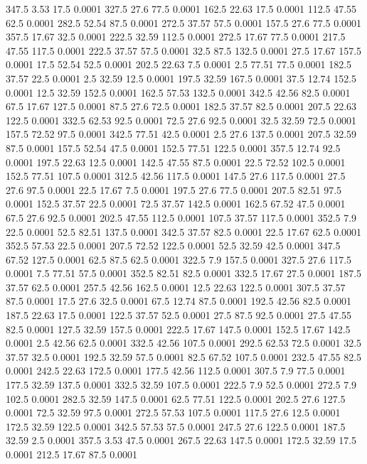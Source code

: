 347.5	3.53	17.5	0.0001
327.5	27.6	77.5	0.0001
162.5	22.63	17.5	0.0001
112.5	47.55	62.5	0.0001
282.5	52.54	87.5	0.0001
272.5	37.57	57.5	0.0001
157.5	27.6	77.5	0.0001
357.5	17.67	32.5	0.0001
222.5	32.59	112.5	0.0001
272.5	17.67	77.5	0.0001
217.5	47.55	117.5	0.0001
222.5	37.57	57.5	0.0001
32.5	87.5	132.5	0.0001
27.5	17.67	157.5	0.0001
17.5	52.54	52.5	0.0001
202.5	22.63	7.5	0.0001
2.5	77.51	77.5	0.0001
182.5	37.57	22.5	0.0001
2.5	32.59	12.5	0.0001
197.5	32.59	167.5	0.0001
37.5	12.74	152.5	0.0001
12.5	32.59	152.5	0.0001
162.5	57.53	132.5	0.0001
342.5	42.56	82.5	0.0001
67.5	17.67	127.5	0.0001
87.5	27.6	72.5	0.0001
182.5	37.57	82.5	0.0001
207.5	22.63	122.5	0.0001
332.5	62.53	92.5	0.0001
72.5	27.6	92.5	0.0001
32.5	32.59	72.5	0.0001
157.5	72.52	97.5	0.0001
342.5	77.51	42.5	0.0001
2.5	27.6	137.5	0.0001
207.5	32.59	87.5	0.0001
157.5	52.54	47.5	0.0001
152.5	77.51	122.5	0.0001
357.5	12.74	92.5	0.0001
197.5	22.63	12.5	0.0001
142.5	47.55	87.5	0.0001
22.5	72.52	102.5	0.0001
152.5	77.51	107.5	0.0001
312.5	42.56	117.5	0.0001
147.5	27.6	117.5	0.0001
27.5	27.6	97.5	0.0001
22.5	17.67	7.5	0.0001
197.5	27.6	77.5	0.0001
207.5	82.51	97.5	0.0001
152.5	37.57	22.5	0.0001
72.5	37.57	142.5	0.0001
162.5	67.52	47.5	0.0001
67.5	27.6	92.5	0.0001
202.5	47.55	112.5	0.0001
107.5	37.57	117.5	0.0001
352.5	7.9	22.5	0.0001
52.5	82.51	137.5	0.0001
342.5	37.57	82.5	0.0001
22.5	17.67	62.5	0.0001
352.5	57.53	22.5	0.0001
207.5	72.52	122.5	0.0001
52.5	32.59	42.5	0.0001
347.5	67.52	127.5	0.0001
62.5	87.5	62.5	0.0001
322.5	7.9	157.5	0.0001
327.5	27.6	117.5	0.0001
7.5	77.51	57.5	0.0001
352.5	82.51	82.5	0.0001
332.5	17.67	27.5	0.0001
187.5	37.57	62.5	0.0001
257.5	42.56	162.5	0.0001
12.5	22.63	122.5	0.0001
307.5	37.57	87.5	0.0001
17.5	27.6	32.5	0.0001
67.5	12.74	87.5	0.0001
192.5	42.56	82.5	0.0001
187.5	22.63	17.5	0.0001
122.5	37.57	52.5	0.0001
27.5	87.5	92.5	0.0001
27.5	47.55	82.5	0.0001
127.5	32.59	157.5	0.0001
222.5	17.67	147.5	0.0001
152.5	17.67	142.5	0.0001
2.5	42.56	62.5	0.0001
332.5	42.56	107.5	0.0001
292.5	62.53	72.5	0.0001
32.5	37.57	32.5	0.0001
192.5	32.59	57.5	0.0001
82.5	67.52	107.5	0.0001
232.5	47.55	82.5	0.0001
242.5	22.63	172.5	0.0001
177.5	42.56	112.5	0.0001
307.5	7.9	77.5	0.0001
177.5	32.59	137.5	0.0001
332.5	32.59	107.5	0.0001
222.5	7.9	52.5	0.0001
272.5	7.9	102.5	0.0001
282.5	32.59	147.5	0.0001
62.5	77.51	122.5	0.0001
202.5	27.6	127.5	0.0001
72.5	32.59	97.5	0.0001
272.5	57.53	107.5	0.0001
117.5	27.6	12.5	0.0001
172.5	32.59	122.5	0.0001
342.5	57.53	57.5	0.0001
247.5	27.6	122.5	0.0001
187.5	32.59	2.5	0.0001
357.5	3.53	47.5	0.0001
267.5	22.63	147.5	0.0001
172.5	32.59	17.5	0.0001
212.5	17.67	87.5	0.0001
